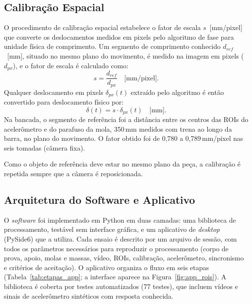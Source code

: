 \documentclass[a4paper,10pt,twocolumn]{article}
\begin{document}
\subsection{Calibração Espacial}
\label{sec:calibracao}

O procedimento de calibração espacial estabelece o fator de escala $s$~[mm/pixel] que converte os deslocamentos medidos em pixels pelo algoritmo de fase para unidade física de comprimento. Um segmento de comprimento conhecido $d_{ref}$~[mm], situado no mesmo plano do movimento, é medido na imagem em pixels ($d_{px}$), e o fator de escala é calculado como:
\begin{equation}
    s = \frac{d_{ref}}{d_{px}} \quad \text{[mm/pixel]}.
    \label{eq:escala}
\end{equation}
Qualquer deslocamento em pixels $\delta_{px}(t)$ extraído pelo algoritmo é então convertido para deslocamento físico por:
\begin{equation}
    \delta(t) = s \cdot \delta_{px}(t) \quad \text{[mm]}.
    \label{eq:deslocamento_fisico}
\end{equation}
Na bancada, o segmento de referência foi a distância entre os centros das ROIs do acelerômetro e do parafuso da mola, 350\,mm medidos com trena ao longo da barra, no plano do movimento. O fator obtido foi de 0,780 a 0,789\,mm/pixel nas seis tomadas (câmera fixa). %

Como o objeto de referência deve estar no mesmo plano da peça, a calibração é repetida sempre que a câmera é reposicionada.

\subsection{Arquitetura do Software e Aplicativo}
\label{sec:software}

O \textit{software} foi implementado em Python em duas camadas: uma biblioteca de processamento, testável sem interface gráfica, e um aplicativo de \textit{desktop} (PySide6) que a utiliza. Cada ensaio é descrito por um arquivo de sessão, com todos os parâmetros necessários para reproduzir o processamento (corpo de prova, apoio, molas e massas, vídeo, ROIs, calibração, acelerômetro, sincronismo e critérios de aceitação). O aplicativo organiza o fluxo em seis etapas (Tabela~\ref{tab:etapas_app}; a interface aparece na Figura~\ref{fig:app_rois}). A biblioteca é coberta por testes automatizados (77 testes), que incluem vídeos e sinais de acelerômetro sintéticos com resposta conhecida.
\end{document}
